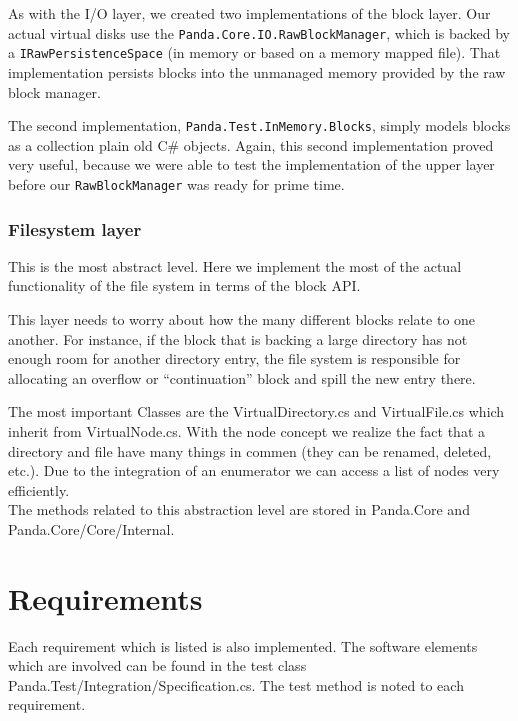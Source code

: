 \documentclass[a4paper,12pt]{article}
\begin{document}
As with the I/O layer, we created two implementations of the block layer.
Our actual virtual disks use the \texttt{Panda.Core.IO.RawBlockManager}, which is backed by a \texttt{IRawPersistenceSpace} (in memory or based on a memory mapped file).
That implementation persists blocks into the unmanaged memory provided by the raw block manager.

The second implementation, \texttt{Panda.Test.InMemory.Blocks}, simply models blocks as a collection plain old C\# objects.
Again, this second implementation proved very useful, because we were able to test the implementation of the upper layer before our \texttt{RawBlockManager} was ready for prime time.

\subsubsection{Filesystem layer}

This is the most abstract level. 
Here we implement the most of the actual functionality of the file system in terms of the block API.

This layer needs to worry about how the many different blocks relate to one another.
For instance, if the block that is backing a large directory has not enough room for another directory entry, the file system is responsible for allocating an overflow or ``continuation'' block and spill the new entry there.

The most important Classes are the VirtualDirectory.cs and VirtualFile.cs which inherit from VirtualNode.cs. With the node concept we realize the fact that a directory and file have many things in commen (they can be renamed, deleted, etc.). Due to the integration of an enumerator we can access a list of nodes very efficiently.\\

The methods related to this abstraction level are stored in Panda.Core and  Panda.Core/Core/Internal.







\section{Requirements}

Each requirement which is listed is also implemented. The software elements which are involved can be found in the test class \hbox{Panda.Test/Integration/Specification.cs}. The test method is noted to each requirement.
\end{document}
